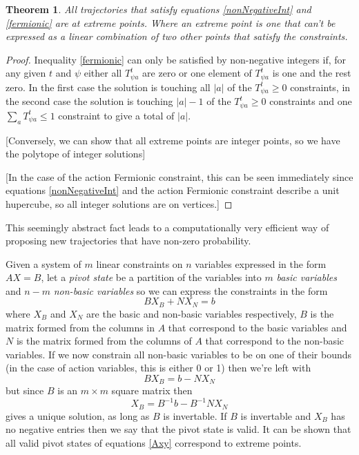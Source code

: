 \documentclass{article}
\newtheorem{theorem}{Theorem}
\begin{document}
\begin{theorem}
	All trajectories that satisfy equations \ref{nonNegativeInt} and \ref{fermionic} are at extreme points. Where an extreme point is one that can't be expressed as a linear combination of two other points that satisfy the constraints.
\end{theorem}
\begin{proof}
	
	Inequality \ref{fermionic} can only be satisfied by non-negative integers if, for any given $t$ and $\psi$ either all $T^t_{\psi a}$ are zero or one element of $T^t_{\psi a}$ is one and the rest zero. In the first case the solution is touching all $|a|$ of the $T^t_{\psi a} \ge 0$ constraints, in the second case the solution is touching $|a|-1$ of the $T^t_{\psi a} \ge 0$ constraints and one $\sum_a T^t_{\psi a} \le 1$ constraint to give a total of $|a|$.
	
	[Conversely, we can show that all extreme points are integer points, so we have the polytope of integer solutions]
	
	[In the case of the action Fermionic constraint, this can be seen immediately since equations \ref{nonNegativeInt} and the action Fermionic constraint describe a unit hupercube, so all integer solutions are on vertices.]
	
\end{proof}


This seemingly abstract fact leads to a computationally very efficient way of proposing new trajectories that have non-zero probability.

Given a system of $m$ linear constraints on $n$ variables expressed in the form $AX=B$, let a \textit{pivot state} be a partition of the variables into $m$ \textit{basic variables} and $n-m$ \textit{non-basic variables} so we can express the constraints in the form
\begin{equation}
BX_B + NX_N = b
\label{tableau1}
\end{equation}
where $X_B$ and $X_N$ are the basic and non-basic variables respectively, $B$ is the matrix formed from the columns in $A$ that correspond to the basic variables and $N$ is the matrix formed from the columns of $A$ that correspond to the non-basic variables. If we now constrain all non-basic variables to be on one of their bounds (in the case of action variables, this is either 0 or 1) then we're left with
\[
BX_B = b - NX_N
\]
but since $B$ is an $m \times m$ square matrix then 
\[
X_B = B^{-1}b - B^{-1}NX_N
\]
gives a unique solution, as long as $B$ is invertable. If $B$ is invertable and $X_B$ has no negative entries then we say that the pivot state is valid. It can be shown that all valid pivot states of equations \ref{Axy} correspond to extreme points\cite{dantzig1955generalized}.
\end{document}
